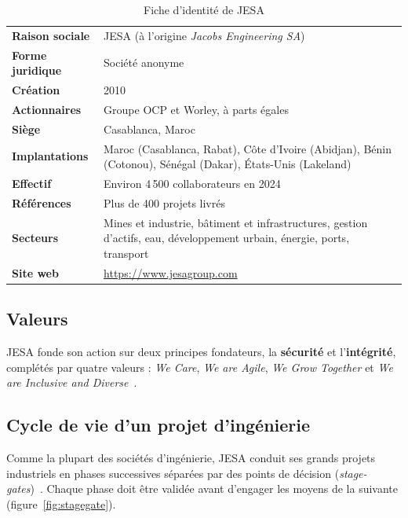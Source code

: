 \begin{table}[H]
\centering
\caption{Fiche d'identité de JESA}
\label{tab:fiche}
\begin{tabularx}{\textwidth}{>{\bfseries}l X}
\toprule
Raison sociale & JESA (à l'origine \textit{Jacobs Engineering SA})~\cite{jesawiki} \\
Forme juridique & Société anonyme~\cite{jesawiki} \\
Création & 2010~\cite{jesaabout} \\
Actionnaires & Groupe OCP et Worley, à parts égales~\cite{jesawiki} \\
Siège & Casablanca, Maroc~\cite{jesaabout} \\
Implantations & Maroc (Casablanca, Rabat), Côte d'Ivoire (Abidjan), Bénin (Cotonou), Sénégal (Dakar), États-Unis (Lakeland)~\cite{jesaabout} \\
Effectif & Environ 4\,500 collaborateurs en 2024~\cite{jesaabout} \\
Références & Plus de 400 projets livrés~\cite{jesaabout} \\
Secteurs & Mines et industrie, bâtiment et infrastructures, gestion d'actifs, eau, développement urbain, énergie, ports, transport~\cite{jesaabout} \\
Site web & \url{https://www.jesagroup.com} \\
\bottomrule
\end{tabularx}
\end{table}

\subsection{Valeurs}
JESA fonde son action sur deux principes fondateurs, la \textbf{sécurité} et l'\textbf{intégrité}, complétés par quatre valeurs : \textit{We Care}, \textit{We are Agile}, \textit{We Grow Together} et \textit{We are Inclusive and Diverse}~\cite{jesaabout}.

\subsection{Cycle de vie d'un projet d'ingénierie}
Comme la plupart des sociétés d'ingénierie, JESA conduit ses grands projets industriels en phases successives séparées par des points de décision (\textit{stage-gates})~\cite{cooper1990}. Chaque phase doit être validée avant d'engager les moyens de la suivante (figure~\ref{fig:stagegate}).

